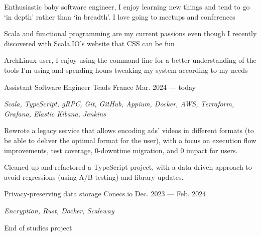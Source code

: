 \begin{MainPart}
  \color{Black}
  \vspace{0.25cm}
  {
    \vspace{-\baselineskip}
    \begin{flushleft}
      Enthusiastic baby software engineer, I enjoy learning new things and tend to go `in depth' rather than `in breadth'. I love going to meetups and conferences

      \vspace{0.5\baselineskip}
      Scala and functional programming are my current passions even though I recently discovered with Scala.IO's website that CSS can be fun

      \vspace{0.5\baselineskip}
      ArchLinux user, I enjoy using the command line for a better understanding of the tools I'm using and spending hours tweaking my system according to my needs
    \end{flushleft}
  }

  \Experience%
  {Assistant Software Engineer}
  {Teads France}
  {Mar. 2024 --- today}
  {
    \textit{Scala, TypeScript, gRPC, Git, GitHub, Appium, Docker, AWS, Terraform, Grafana, Elastic Kibana, Jenkins}

    \begin{ItemList}{\ColorHighlight}
      \item[\ding{226}] Rewrote a legacy service that allows encoding ads' videos in different formats (to be able to deliver the optimal format for the user), with a focus on execution flow improvements, test coverage, 0-downtime migration, and 0 impact for users.
      \item[\ding{226}] Cleaned up and refactored a TypeScript project, with a data-driven approach to avoid regressions (using A/B testing) and library updates.
    \end{ItemList}
  }
  \Experience%
  {Privacy-preserving data storage}
  {Conecs.io}
  {Dec. 2023 --- Feb. 2024}
  {
    \textit{Encryption, Rust, Docker, Scaleway}

    End of studies project

}
\end{MainPart}
